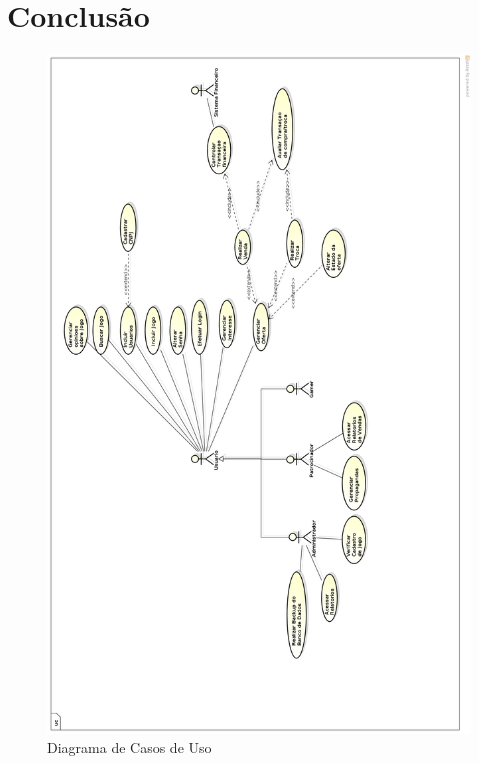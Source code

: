 \documentclass[a4paper,11pt]{article}
\begin{document}
\section{Conclusão}

\begin{figure}[!H]
    		\centering
        	\includegraphics[width=\textwidth,height=\dimexpr\textheight-3\baselineskip\relax,keepaspectratio]{Diagrama.png}
        	\caption{Diagrama de Casos de Uso}
     		\label{diagrama}
\end{figure}
    	
\end{document}
